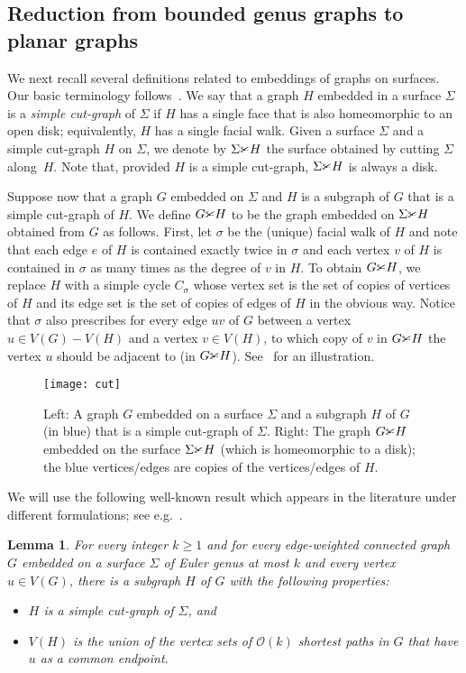 \documentclass[11pt,a4paper]{article}
\newtheorem{lemma}{Lemma}[section]
\renewcommand{\ge}{\geqslant}
\renewcommand{\setminus}{-}
\newcommand{\cutgraph}{\textrm{\CutLeft}}
\begin{document}
\subsection{Reduction from bounded genus graphs to planar graphs}


We next recall several definitions related to embeddings of graphs on surfaces.
Our basic terminology follows~\cite{MoharT01grap}.
We say that a graph $H$ embedded in a surface $\Sigma$ is a {\em{simple cut-graph}} of $\Sigma$ if $H$ has a single face that is also homeomorphic to an open disk; equivalently, $H$ has a single facial walk.
Given a surface $\Sigma$ and a simple cut-graph $H$ on $\Sigma$, we denote by $\Sigma\cutgraph H$ the surface obtained by cutting $\Sigma$ along~$H$. Note that, provided $H$ is a simple cut-graph, $\Sigma\cutgraph H$ is always a disk.

Suppose now that a graph $G$ embedded on  $\Sigma$ and $H$ is a subgraph of $G$ that is a simple cut-graph of $H$.
We define $G\cutgraph H$ to be the graph embedded on $\Sigma\cutgraph H$ obtained from $G$ as follows.
First, let $\sigma$ be the (unique) facial walk of $H$ and note that each edge $e$ of $H$ is contained exactly twice in $\sigma$ and each vertex $v$ of $H$ is contained in $\sigma$ as many times as the degree of $v$ in $H$.
To obtain $G\cutgraph H$, we replace $H$ with a simple cycle $C_\sigma$ whose vertex set is the set of copies of vertices of $H$ and its edge set is the set of copies of edges of $H$ in the obvious way. Notice that $\sigma$ also prescribes for every edge $uv$ of $G$ between a vertex $u\in V(G)\setminus V(H)$ and a vertex $v\in V(H)$, to which copy of $v$ in $G\cutgraph H$ the vertex $u$ should be adjacent to (in $G\cutgraph H$).
See~ for an illustration.

\begin{figure}[ht]
  \centering
  \texttt{[image: cut]}
  \caption{Left: A graph $G$ embedded on a surface $\Sigma$ and a subgraph $H$ of $G$ (in blue) that is a simple cut-graph of $\Sigma$. Right: The graph $G\cutgraph H$ embedded on the surface $\Sigma\cutgraph H$ (which is homeomorphic to a disk); the blue vertices/edges are copies of the vertices/edges of $H$.}
  \label{fig:cutopen}
\end{figure}

We will use the following well-known result which appears in the literature under different formulations; see e.g.~\cite{BorradaileDT14,CabelloCL12algo,EricksonW05}.

\begin{lemma}\label{lem:genuscut}
  For every integer $k\ge 1$ and for every edge-weighted connected graph $G$ embedded on a surface $\Sigma$ of Euler genus at most $k$ and every vertex $u\in V(G)$, there is a subgraph $H$ of $G$ with the following properties:
  \begin{itemize}[nosep]
    \item  $H$ is a simple cut-graph of $\Sigma$, and
    \item  $V(H)$ is the union of the vertex sets of $\mathcal{O}(k)$ shortest paths in $G$ that have $u$ as a common endpoint.
  \end{itemize}
  \end{lemma}
\end{document}
